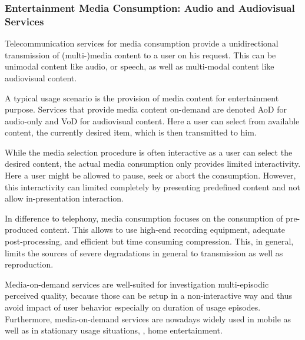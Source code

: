 \subsubsection{Entertainment Media Consumption: Audio and Audiovisual Services}
Telecommunication services for media consumption provide a unidirectional transmission of (multi-)media content to a user on his request.
This can be unimodal content like audio, or speech, as well as multi-modal content like audiovisual content.

A typical usage scenario is the provision of media content for entertainment purpose.
Services that provide media content on-demand are denoted \ac{AoD} for audio-only and \ac{VoD} for audiovisual content.
Here a user can select from available content, the currently desired item, which is then transmitted to him.

While the media selection procedure is often interactive as a user can select the desired content, the actual media consumption only provides limited interactivity.
Here a user might be allowed to pause, seek or abort the consumption.
However, this interactivity can limited completely by presenting predefined content and not allow in-presentation interaction.

In difference to telephony, media consumption focuses on the consumption of pre-produced content.
This allows to use high-end recording equipment, adequate post-processing, and efficient but time consuming compression.
This, in general, limits the sources of severe degradations in general to transmission as well as reproduction.

Media-on-demand services are well-suited for investigation multi-episodic perceived quality, because those can be setup in a non-interactive way and thus avoid impact of user behavior especially on duration of usage episodes.
Furthermore, media-on-demand services are nowadays widely used in mobile as well as in stationary usage situations, \ie, home entertainment. 

